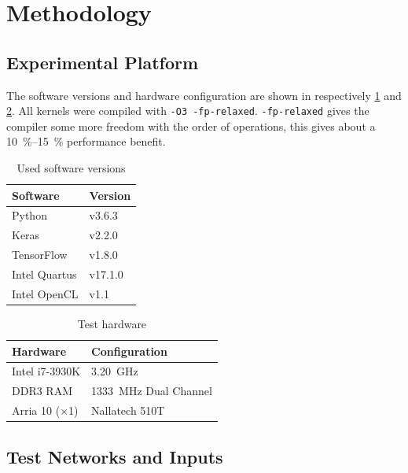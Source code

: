 \documentclass[techrep,english]{ipsj} %
\begin{document}
\section{Methodology}\label{sec:method}
\subsection{Experimental Platform}
The software versions and hardware configuration are shown in respectively \cref{tab:software-versions} and \cref{tab:test-hardware}.
All kernels were compiled with \texttt{-O3 -fp-relaxed}.
\texttt{-fp-relaxed} gives the compiler some more freedom with the order of operations, this gives about a \SIrange{10}{15}{\percent} performance benefit.%
\begin{table}[h]
  \centering
  \caption{Used software versions}\label{tab:software-versions}
  \begin{tabular}{ll}
    \toprule
    \textbf{Software} & \textbf{Version} \\
    \midrule
    Python & v3.6.3 \\
    Keras & v2.2.0 \\
    TensorFlow & v1.8.0 \\
    Intel Quartus & v17.1.0 \\
    Intel OpenCL & v1.1 \\
    \bottomrule
  \end{tabular}
\end{table}
\begin{table}[h]
  \centering
  \caption{Test hardware}\label{tab:test-hardware}
  \begin{tabular}{ll}
    \toprule
    \textbf{Hardware} & \textbf{Configuration} \\
    \midrule
    Intel i7-3930K & \SI{3.20}{\giga\hertz} \\
    DDR3 RAM & \SI{1333}{\mega\hertz} Dual Channel \\
    Arria 10 ($\times$1) & Nallatech 510T \\
    \bottomrule
  \end{tabular}
\end{table}

\subsection{Test Networks and Inputs}
\end{document}
